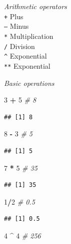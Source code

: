 \documentclass[
]{book}
\newenvironment{Shaded}{\begin{snugshade}}{\end{snugshade}}
\newcommand{\CommentTok}[1]{\textcolor[rgb]{0.56,0.35,0.01}{\textit{#1}}}
\newcommand{\DecValTok}[1]{\textcolor[rgb]{0.00,0.00,0.81}{#1}}
\newcommand{\SpecialCharTok}[1]{\textcolor[rgb]{0.81,0.36,0.00}{\textbf{#1}}}
\begin{document}
\emph{Arithmetic operators}\\
\texttt{+} Plus\\
\texttt{–} Minus\\
\texttt{*} Multiplication\\
\texttt{/} Division\\
\texttt{\^{}} Exponential\\
\texttt{**} Exponential

\emph{Basic operations}

\begin{Shaded}
\begin{Highlighting}[]
\DecValTok{3} \SpecialCharTok{+} \DecValTok{5}   \CommentTok{\# 8}
\end{Highlighting}
\end{Shaded}

\begin{verbatim}
## [1] 8
\end{verbatim}

\begin{Shaded}
\begin{Highlighting}[]
\DecValTok{8} \SpecialCharTok{{-}} \DecValTok{3}   \CommentTok{\# 5}
\end{Highlighting}
\end{Shaded}

\begin{verbatim}
## [1] 5
\end{verbatim}

\begin{Shaded}
\begin{Highlighting}[]
\DecValTok{7} \SpecialCharTok{*} \DecValTok{5}   \CommentTok{\# 35}
\end{Highlighting}
\end{Shaded}

\begin{verbatim}
## [1] 35
\end{verbatim}

\begin{Shaded}
\begin{Highlighting}[]
\DecValTok{1}\SpecialCharTok{/}\DecValTok{2}     \CommentTok{\# 0.5}
\end{Highlighting}
\end{Shaded}

\begin{verbatim}
## [1] 0.5
\end{verbatim}

\begin{Shaded}
\begin{Highlighting}[]
\DecValTok{4} \SpecialCharTok{\^{}} \DecValTok{4}   \CommentTok{\# 256}
\end{Highlighting}
\end{Shaded}
\end{document}
